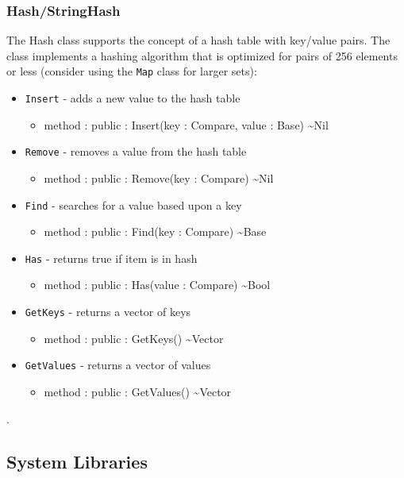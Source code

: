 \documentclass[12pt]{article}
\begin{document}
\subsubsection{Hash/StringHash}
The Hash class supports the concept of a hash table with key/value
pairs.  The class implements a hashing algorithm that is optimized for
pairs of 256 elements or less (consider using the \texttt{Map} class
for larger sets):
\begin{itemize}
\item \texttt{Insert} - adds a new value to the hash table
  \begin{itemize}
  \item method : public : Insert(key : Compare, value : Base) \textasciitilde Nil
  \end{itemize}
\item \texttt{Remove} - removes a value from the hash table
  \begin{itemize}
  \item method : public : Remove(key : Compare) \textasciitilde Nil
  \end{itemize}
\item \texttt{Find} - searches for a value based upon a key
  \begin{itemize}
  \item method : public : Find(key : Compare) \textasciitilde Base
  \end{itemize}
\item \texttt{Has} - returns true if item is in hash
  \begin{itemize}
  \item method : public : Has(value : Compare) \textasciitilde Bool
  \end{itemize}
\item \texttt{GetKeys} - returns a vector of keys
  \begin{itemize}
  \item method : public : GetKeys() \textasciitilde Vector
  \end{itemize}
\item \texttt{GetValues} - returns a vector of values
  \begin{itemize}
  \item method : public : GetValues() \textasciitilde Vector
  \end{itemize}
\end{itemize}.

\subsection{System Libraries}
\end{document}
